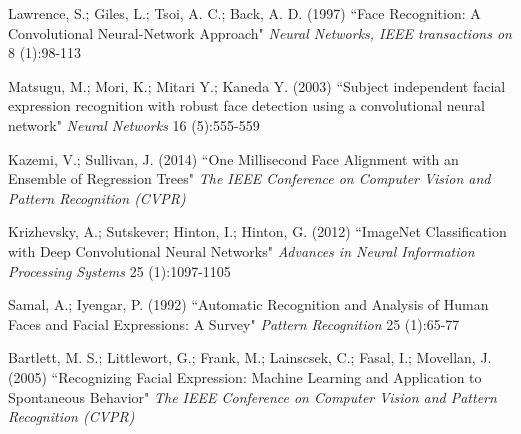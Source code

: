 \documentclass[10pt, twocolumn, twoside]{article}
\begin{document}
\begin{thebibliography}{9}
Lawrence, S.; Giles, L.; Tsoi, A. C.; Back, A. D. (1997)
``Face Recognition: A Convolutional Neural-Network Approach"
\textit{Neural Networks, IEEE transactions on} 8 (1):98-113

Matsugu, M.; Mori, K.; Mitari Y.; Kaneda Y. (2003)
``Subject independent facial expression recognition with robust face detection using a convolutional neural network"
\textit{Neural Networks} 16 (5):555-559

Kazemi, V.; Sullivan, J. (2014)
``One Millisecond Face Alignment with an Ensemble of Regression Trees"
\textit{The IEEE Conference on Computer Vision and Pattern Recognition (CVPR)}

Krizhevsky, A.; Sutskever; Hinton, I.; Hinton, G. (2012)
``ImageNet Classification with Deep Convolutional Neural Networks"
\textit{Advances in Neural Information Processing Systems} 25 (1):1097-1105

Samal, A.; Iyengar, P. (1992)
``Automatic Recognition and Analysis of Human Faces and Facial Expressions: A Survey"
\textit{Pattern Recognition} 25 (1):65-77

Bartlett, M. S.; Littlewort, G.; Frank, M.; Lainscsek, C.; Fasal, I.; Movellan, J. (2005)
``Recognizing Facial Expression: Machine Learning and Application to Spontaneous Behavior"
\textit{The IEEE Conference on Computer Vision and Pattern Recognition (CVPR)}

\end{thebibliography}
\end{document}

